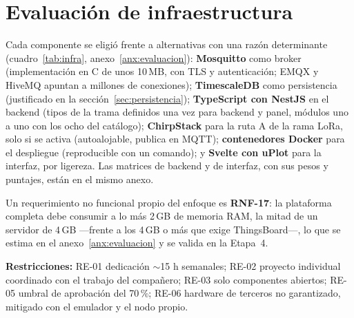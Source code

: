 \section{Evaluación de infraestructura}
\label{sec:infra}

Cada componente se eligió frente a alternativas con una razón determinante (cuadro~\ref{tab:infra}, anexo~\ref{anx:evaluacion}): \textbf{Mosquitto} como broker (implementación en C de unos 10\,MB, con TLS y autenticación; EMQX y HiveMQ apuntan a millones de conexiones); \textbf{TimescaleDB} como persistencia (justificado en la sección~\ref{sec:persistencia}); \textbf{TypeScript con NestJS} en el backend (tipos de la trama definidos una vez para backend y panel, módulos uno a uno con los ocho del catálogo); \textbf{ChirpStack} para la ruta A de la rama LoRa, solo si se activa (autoalojable, publica en MQTT); \textbf{contenedores Docker} para el despliegue (reproducible con un comando); y \textbf{Svelte con uPlot} para la interfaz, por ligereza. Las matrices de backend y de interfaz, con sus pesos y puntajes, están en el mismo anexo.

Un requerimiento no funcional propio del enfoque es \textbf{RNF-17}: la plataforma completa debe
consumir a lo más 2\,GB de memoria RAM, la mitad de un servidor de 4\,GB —frente a los 4\,GB o más que exige ThingsBoard—, lo que se estima en el anexo~\ref{anx:evaluacion} y se valida en la Etapa~4.

\textbf{Restricciones:} RE-01 dedicación $\sim$15 h semanales; RE-02 proyecto individual coordinado
con el trabajo del compañero; RE-03 solo componentes abiertos; RE-05 umbral de aprobación del
70\,\%; RE-06 hardware de terceros no garantizado, mitigado con el emulador y el nodo propio.
